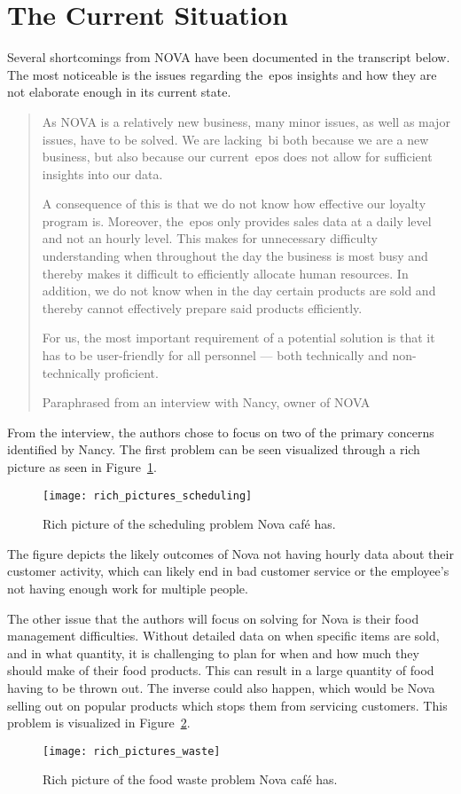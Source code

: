\section{The Current Situation}\label{sec:the-current-situation}

Several shortcomings from NOVA have been documented in the transcript below.
The most noticeable is the issues regarding the~\acrfull{epos} insights and how they are not elaborate enough in its
current state.

\blockquote[Paraphrased from an interview with Nancy, owner of NOVA]{As NOVA is a relatively new business, many minor
issues, as well as major issues, have to be solved.
We are lacking~\acrshort{bi} both because we are a new business, but also because our current~\acrshort{epos} does not
allow for sufficient insights into our data.

A consequence of this is that we do not know how effective our loyalty program is.
Moreover, the~\acrshort{epos} only provides sales data at a daily level and not an hourly level.
This makes for unnecessary difficulty understanding when throughout the day the business is most busy and thereby makes
it difficult to efficiently allocate human resources.
In addition, we do not know when in the day certain products are sold and thereby cannot effectively prepare said
products efficiently.

For us, the most important requirement of a potential solution is that it has to be user-friendly for all personnel —
both technically and non-technically proficient.}

From the interview, the authors chose to focus on two of the primary concerns identified by Nancy.
The first problem can be seen visualized through a rich picture as seen in Figure~\ref{fig:pda-scheduling-problem}.
\begin{figure}[H]
    \centering
    \texttt{[image: rich\_pictures\_scheduling]}
    \caption{Rich picture of the scheduling problem Nova café has.}\label{fig:pda-scheduling-problem}
\end{figure}
The figure depicts the likely outcomes of Nova not having hourly data about their customer activity,
which can likely end in bad customer service or the employee's not having enough work for multiple people.

The other issue that the authors will focus on solving for Nova is their food management difficulties.
Without detailed data on when specific items are sold, and in what quantity, it is challenging to plan
for when and how much they should make of their food products.
This can result in a large quantity of food having to be thrown out.
The inverse could also happen, which would be Nova selling out on popular products which stops them
from servicing customers.
This problem is visualized in Figure~\ref{fig:pda-waste-problem}.

\begin{figure}[H]
    \centering
    \texttt{[image: rich\_pictures\_waste]}
    \caption{Rich picture of the food waste problem Nova café has.}\label{fig:pda-waste-problem}
\end{figure}
